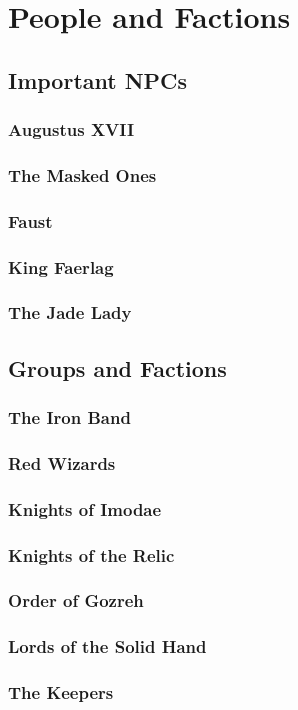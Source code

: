 \section{People and Factions}
	
	\subsection{Important NPCs}

		\subsubsection{Augustus XVII}

		\subsubsection{The Masked Ones}

		\subsubsection{Faust}

		\subsubsection{King Faerlag}

		\subsubsection{The Jade Lady}

	\subsection{Groups and Factions}

		\subsubsection{The Iron Band}

		\subsubsection{Red Wizards}
	
		\subsubsection{Knights of Imodae}

		\subsubsection{Knights of the Relic}

		\subsubsection{Order of Gozreh}

		\subsubsection{Lords of the Solid Hand}

		\subsubsection{The Keepers}

